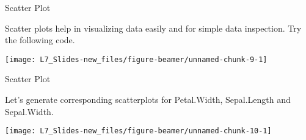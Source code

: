 \documentclass[ignorenonframetext,]{beamer}
\newenvironment{Shaded}{\begin{snugshade}}{\end{snugshade}}
\newcommand{\KeywordTok}[1]{\textcolor{white}{\textbf{{#1}}}}
\newcommand{\NormalTok}[1]{\textcolor{yellow}{{#1}}}
\newcommand{\DataTypeTok}[1]{\textcolor{yellow}{{#1}}}
\newcommand{\DecValTok}[1]{\textcolor{numbercolor}{{#1}}}
\newcommand{\StringTok}[1]{\textcolor{yellow}{{#1}}}
\begin{document}
\begin{frame}[fragile]{Scatter Plot}

Scatter plots help in visualizing data easily and for simple data
inspection. Try the following code.

\small

\begin{Shaded}
\end{Shaded}

\begin{center}\texttt{[image: L7\_Slides-new\_files/figure-beamer/unnamed-chunk-9-1]} \end{center}

\end{frame}

\begin{frame}[fragile]{Scatter Plot}

Let's generate corresponding scatterplots for Petal.Width, Sepal.Length
and Sepal.Width.

\small

\begin{Shaded}
\end{Shaded}

\begin{center}\texttt{[image: L7\_Slides-new\_files/figure-beamer/unnamed-chunk-10-1]} \end{center}

\end{frame}
\end{document}
